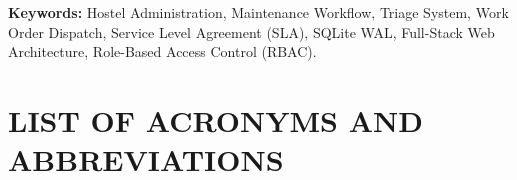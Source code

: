 \documentclass[10pt]{report}
\begin{document}
\vspace{0.3cm}
\noindent \textbf{Keywords:} Hostel Administration, Maintenance Workflow, Triage System, Work Order Dispatch, Service Level Agreement (SLA), SQLite WAL, Full-Stack Web Architecture, Role-Based Access Control (RBAC).

\newpage
\renewcommand*\listfigurename{LIST OF FIGURES}
\listoffigures

\newpage
\renewcommand{\listtablename}{LIST OF TABLES}
\listoftables

\newpage
\chapter*{LIST OF ACRONYMS AND ABBREVIATIONS}
\end{document}
